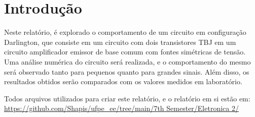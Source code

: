 \section{Introdução}

Neste relatório, é explorado o comportamento de um circuito em configuração Darlington, que consiste em um circuito com dois transistores TBJ em um circuito amplificador emissor de base comum com fontes simétricas de tensão. Uma análise numérica do circuito será realizada, e o comportamento do mesmo será observado tanto para pequenos quanto para grandes sinais. Além disso, os resultados obtidos serão comparados com os valores medidos em laboratório.

Todos arquivos utilizados para criar este relatório, e o relatório em si estão em:  \url{https://github.com/Shapis/ufpe_ee/tree/main/7th Semester/Eletronica 2/}


